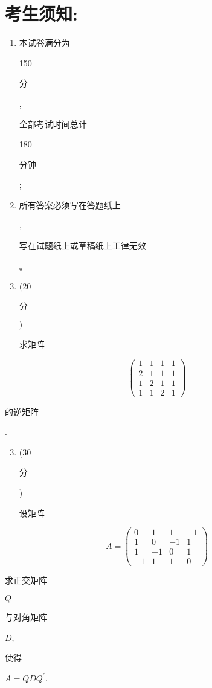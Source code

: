 \documentclass[10pt]{article}
\begin{document}
\section{考生须知:}
\begin{enumerate}
  \item \begin{CJK}{UTF8}{mj}本试卷满分为\end{CJK} 150 \begin{CJK}{UTF8}{mj}分\end{CJK}, \begin{CJK}{UTF8}{mj}全部考试时间总计\end{CJK} 180 \begin{CJK}{UTF8}{mj}分钟\end{CJK};

  \item \begin{CJK}{UTF8}{mj}所有答案必须写在答题纸上\end{CJK}, \begin{CJK}{UTF8}{mj}写在试题纸上或草稿纸上工律无效\end{CJK}。

  \item $(20$ \begin{CJK}{UTF8}{mj}分\end{CJK} $)$ \begin{CJK}{UTF8}{mj}求矩阵\end{CJK}

\end{enumerate}
$$
\left(\begin{array}{llll}
1 & 1 & 1 & 1 \\
2 & 1 & 1 & 1 \\
1 & 2 & 1 & 1 \\
1 & 1 & 2 & 1
\end{array}\right)
$$
\begin{CJK}{UTF8}{mj}的逆矩阵\end{CJK}.

\begin{enumerate}
  \setcounter{enumi}{2}
  \item (30 \begin{CJK}{UTF8}{mj}分\end{CJK}) \begin{CJK}{UTF8}{mj}设矩阵\end{CJK}
\end{enumerate}
$$
A=\left(\begin{array}{cccc}
0 & 1 & 1 & -1 \\
1 & 0 & -1 & 1 \\
1 & -1 & 0 & 1 \\
-1 & 1 & 1 & 0
\end{array}\right)
$$
\begin{CJK}{UTF8}{mj}求正交矩阵\end{CJK} $Q$ \begin{CJK}{UTF8}{mj}与对角矩阵\end{CJK} $D$, \begin{CJK}{UTF8}{mj}使得\end{CJK} $A=Q D Q^{\prime}$.
\end{document}
